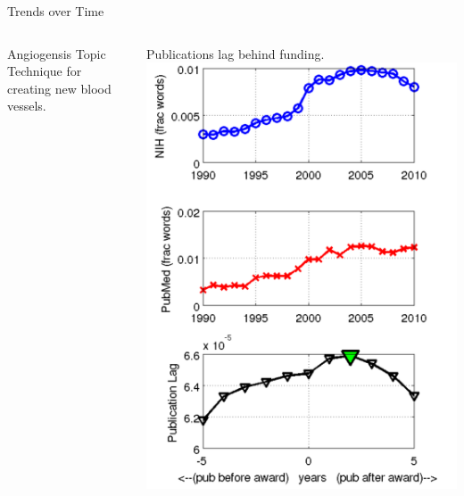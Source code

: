 \begin{frame}{Trends over Time}
  \begin{columns}
      \begin{block}{Angiogensis Topic}
        Technique for creating new blood vessels.
      \end{block}
      Publications lag behind funding.
  \centering
  \includegraphics[width=1.0\linewidth]{topic_models/publication_lag}
  \end{columns}
\end{frame}

